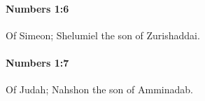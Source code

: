 		\paragraph{Numbers 1:6} %
			\label{NUMBERS-1-6}

			Of Simeon; Shelumiel the son of Zurishaddai.


		\paragraph{Numbers 1:7} %
			\label{NUMBERS-1-7}

			Of Judah; Nahshon the son of Amminadab.


